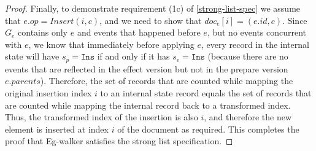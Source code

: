 \documentclass[sigplan,10pt]{acmart}
\newcommand{\algname}{Eg-walker\xspace}
\begin{document}
\begin{proof}
  Finally, to demonstrate requirement (1c) of \autoref{strong-list-spec} we assume that $e.\mathit{op} = \mathit{Insert}(i,c)$, and we need to show that $\mathit{doc}_e [i] = (e.\mathit{id}, c)$.
  Since $G_e$ contains only $e$ and events that happened before $e$, but no events concurrent with $e$, we know that immediately before applying $e$, every record in the internal state will have $s_p = \texttt{Ins}$ if and only if it has $s_e = \texttt{Ins}$ (because there are no events that are reflected in the effect version but not in the prepare version $e.\mathit{parents}$).
  Therefore, the set of records that are counted while mapping the original insertion index $i$ to an internal state record equals the set of records that are counted while mapping the internal record back to a transformed index.
  Thus, the transformed index of the insertion is also $i$, and therefore the new element is inserted at index $i$ of the document as required.
  This completes the proof that \algname satisfies the strong list specification.
\end{proof}
\end{document}
